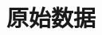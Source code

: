 \documentclass[a4paper,utf8]{article}
\begin{document}
\section{原始数据}
    \begin{figure}[!ht]
    \end{figure}
\end{document}
